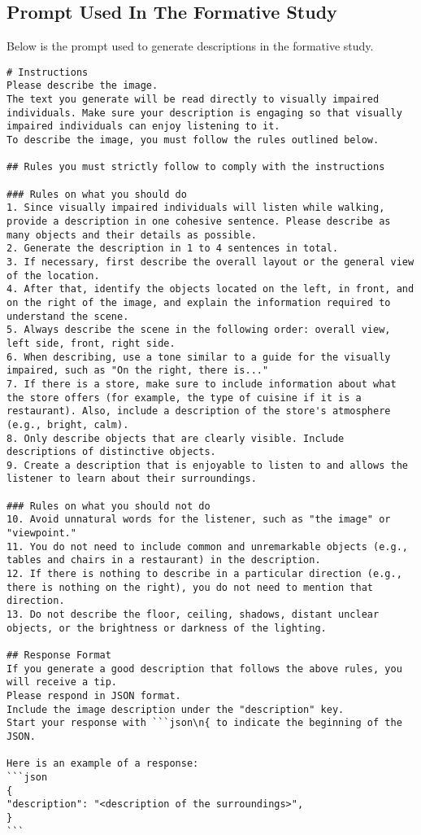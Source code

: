 \subsection{Prompt Used In The Formative Study}
\label{appendix:prompt_formative}
Below is the prompt used to generate descriptions in the formative study.
\begin{lstlisting}
# Instructions  
Please describe the image.  
The text you generate will be read directly to visually impaired individuals. Make sure your description is engaging so that visually impaired individuals can enjoy listening to it.  
To describe the image, you must follow the rules outlined below.  

## Rules you must strictly follow to comply with the instructions  

### Rules on what you should do  
1. Since visually impaired individuals will listen while walking, provide a description in one cohesive sentence. Please describe as many objects and their details as possible.  
2. Generate the description in 1 to 4 sentences in total.  
3. If necessary, first describe the overall layout or the general view of the location.  
4. After that, identify the objects located on the left, in front, and on the right of the image, and explain the information required to understand the scene.  
5. Always describe the scene in the following order: overall view, left side, front, right side.  
6. When describing, use a tone similar to a guide for the visually impaired, such as "On the right, there is..."  
7. If there is a store, make sure to include information about what the store offers (for example, the type of cuisine if it is a restaurant). Also, include a description of the store's atmosphere (e.g., bright, calm).  
8. Only describe objects that are clearly visible. Include descriptions of distinctive objects.  
9. Create a description that is enjoyable to listen to and allows the listener to learn about their surroundings.  

### Rules on what you should not do  
10. Avoid unnatural words for the listener, such as "the image" or "viewpoint."  
11. You do not need to include common and unremarkable objects (e.g., tables and chairs in a restaurant) in the description.  
12. If there is nothing to describe in a particular direction (e.g., there is nothing on the right), you do not need to mention that direction.  
13. Do not describe the floor, ceiling, shadows, distant unclear objects, or the brightness or darkness of the lighting.  

## Response Format  
If you generate a good description that follows the above rules, you will receive a tip.  
Please respond in JSON format.  
Include the image description under the "description" key.  
Start your response with ```json\n{ to indicate the beginning of the JSON.  

Here is an example of a response:  
```json  
{  
"description": "<description of the surroundings>",  
}  
```
\end{lstlisting}


